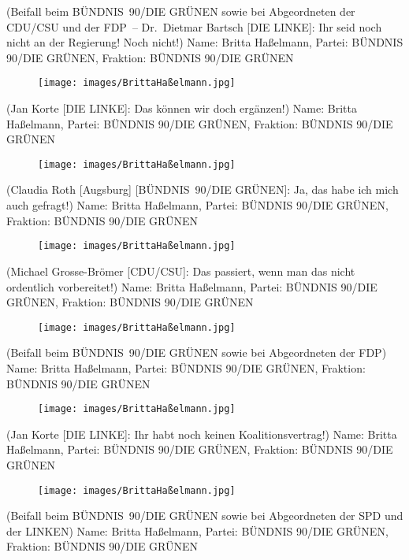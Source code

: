 \documentclass[10pt, a4paper]{report}
\begin{document}
(Beifall beim BÜNDNIS 90/DIE GRÜNEN sowie bei Abgeordneten der CDU/CSU und der FDP – Dr. Dietmar Bartsch [DIE LINKE]: Ihr seid noch nicht an der Regierung! Noch nicht!)
Name: Britta Haßelmann, Partei: BÜNDNIS 90/DIE GRÜNEN, Fraktion: BÜNDNIS 90/DIE GRÜNEN

\begin{figure}[!ht]
\texttt{[image: images/BrittaHaßelmann.jpg]}
\end{figure}


(Jan Korte [DIE LINKE]: Das können wir doch ergänzen!)
Name: Britta Haßelmann, Partei: BÜNDNIS 90/DIE GRÜNEN, Fraktion: BÜNDNIS 90/DIE GRÜNEN

\begin{figure}[!ht]
\texttt{[image: images/BrittaHaßelmann.jpg]}
\end{figure}


(Claudia Roth [Augsburg] [BÜNDNIS 90/DIE GRÜNEN]: Ja, das habe ich mich auch gefragt!)
Name: Britta Haßelmann, Partei: BÜNDNIS 90/DIE GRÜNEN, Fraktion: BÜNDNIS 90/DIE GRÜNEN

\begin{figure}[!ht]
\texttt{[image: images/BrittaHaßelmann.jpg]}
\end{figure}


(Michael Grosse-Brömer [CDU/CSU]: Das passiert, wenn man das nicht ordentlich vorbereitet!)
Name: Britta Haßelmann, Partei: BÜNDNIS 90/DIE GRÜNEN, Fraktion: BÜNDNIS 90/DIE GRÜNEN

\begin{figure}[!ht]
\texttt{[image: images/BrittaHaßelmann.jpg]}
\end{figure}


(Beifall beim BÜNDNIS 90/DIE GRÜNEN sowie bei Abgeordneten der FDP)
Name: Britta Haßelmann, Partei: BÜNDNIS 90/DIE GRÜNEN, Fraktion: BÜNDNIS 90/DIE GRÜNEN

\begin{figure}[!ht]
\texttt{[image: images/BrittaHaßelmann.jpg]}
\end{figure}


(Jan Korte [DIE LINKE]: Ihr habt noch keinen Koalitionsvertrag!)
Name: Britta Haßelmann, Partei: BÜNDNIS 90/DIE GRÜNEN, Fraktion: BÜNDNIS 90/DIE GRÜNEN

\begin{figure}[!ht]
\texttt{[image: images/BrittaHaßelmann.jpg]}
\end{figure}


(Beifall beim BÜNDNIS 90/DIE GRÜNEN sowie bei Abgeordneten der SPD und der LINKEN)
Name: Britta Haßelmann, Partei: BÜNDNIS 90/DIE GRÜNEN, Fraktion: BÜNDNIS 90/DIE GRÜNEN
\end{document}
